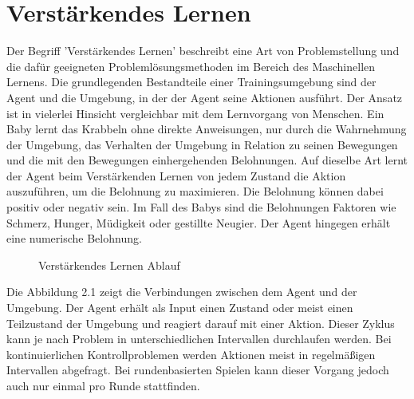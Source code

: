 {\section{Verstärkendes Lernen}}
\label{sec:rl}
Der Begriff 'Verstärkendes Lernen' beschreibt eine Art von Problemstellung und die dafür geeigneten Problemlösungsmethoden im Bereich des Maschinellen Lernens. Die grundlegenden Bestandteile einer Trainingsumgebung sind der Agent und die Umgebung, in der der Agent seine Aktionen ausführt. Der Ansatz ist in vielerlei Hinsicht vergleichbar mit dem Lernvorgang von Menschen. Ein Baby lernt das Krabbeln ohne direkte Anweisungen, nur durch die Wahrnehmung der Umgebung, das Verhalten der Umgebung in Relation zu seinen Bewegungen und die mit den Bewegungen einhergehenden Belohnungen. Auf dieselbe Art lernt der Agent beim Verstärkenden Lernen von jedem Zustand die Aktion auszuführen, um die Belohnung zu maximieren. Die Belohnung können dabei positiv oder negativ sein. Im Fall des Babys sind die Belohnungen Faktoren wie Schmerz, Hunger, Müdigkeit oder gestillte Neugier. Der Agent hingegen erhält eine numerische Belohnung.\cite{sutton2018reinforcement}

\begin{figure}[H]
  \centering
  \caption{Verstärkendes Lernen Ablauf}
  \label{fig:rl_cycle}
\end{figure}

Die Abbildung 2.1 zeigt die Verbindungen zwischen dem Agent und der Umgebung. Der Agent erhält als Input einen Zustand oder meist einen Teilzustand der Umgebung und reagiert darauf mit einer Aktion. Dieser Zyklus kann je nach Problem in unterschiedlichen Intervallen durchlaufen werden. Bei kontinuierlichen Kontrollproblemen werden Aktionen meist in regelmäßigen Intervallen abgefragt. Bei rundenbasierten Spielen kann dieser Vorgang jedoch auch nur einmal pro Runde stattfinden.